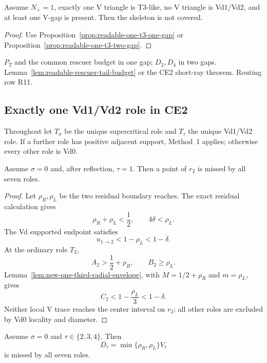 \begin{corollary}
\label{prop:new-one-t3-terminal}
Assume $N_+=1$, exactly one V triangle is T3-like, no V triangle is
Vd1/Vd2, and at least one V-gap is present.  Then the skeleton is not covered.
\end{corollary}

\begin{proof}
Use Proposition~\ref{prop:readable-one-t3-one-gap} or
Proposition~\ref{prop:readable-one-t3-two-gap}.
\end{proof}

{$P_T$ and the common rescuer budget in one gap; $D_2,D_4$ in two gaps.}
{Lemma~\ref{lem:readable-rescuer-tail-budget} or the CE2 short-ray theorem.}
{Routing row R11.}

\subsection{Exactly one Vd1/Vd2 role in CE2}

Throughout let $T_\sigma$ be the unique supercritical role and $T_\tau$ the
unique Vd1/Vd2 role.  If a further role has positive adjacent support,
Method~1 applies; otherwise every other role is Vd0.

\begin{proposition}
\label{prop:readable-one-vd-adjacent}
Assume $\sigma=0$ and, after reflection, $\tau=1$.  Then a point of $r_2$
is missed by all seven roles.
\end{proposition}

\begin{proof}
Let $\rho_R,\rho_L$ be the two residual boundary reaches.  The exact residual
calculation gives
\[
 \rho_R+\rho_L<\frac12,\qquad 4\delta<\rho_L.
\]
The Vd supported endpoint satisfies
\[
 u_{1\to2}<1-\rho_L<1-\delta.
\]
At the ordinary role $T_2$,
\[
 A_2>\frac12+\rho_R,\qquad B_2\ge\rho_L.
\]
Lemma~\ref{lem:new-one-third-radial-envelope}, with
$M=1/2+\rho_R$ and $m=\rho_L$, gives
\[
 C_2<1-\frac{\rho_L}{3}<1-\delta.
\]
Neither local V trace reaches the center interval on $r_2$; all other roles
are excluded by Vd0 locality and diameter.
\end{proof}

\begin{proposition}
\label{prop:readable-one-vd-nonadjacent}
Assume $\sigma=0$ and $\tau\in\{2,3,4\}$.  Then
\[
 D_\tau=\min\{\rho_R,\rho_L\}V_\tau
\]
is missed by all seven roles.
\end{proposition}

